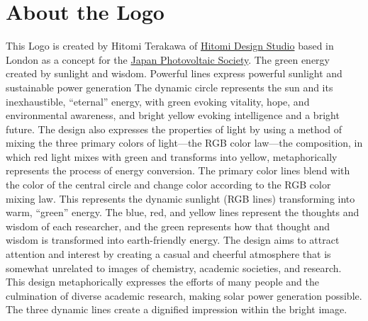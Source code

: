 \documentclass{pst-icon}
\begin{document}
\section{About the Logo}
This Logo is created by Hitomi Terakawa of \href{hitomidesigns.com}{Hitomi Design Studio} based in London as a concept for the \href{https://www.j-pvs.jp/en/}{Japan Photovoltaic Society}. The green energy created by sunlight and wisdom. Powerful lines express powerful sunlight and sustainable power generation 
The dynamic circle represents the sun and its inexhaustible, ``eternal'' energy, with green evoking vitality, hope, and environmental awareness, and bright yellow evoking intelligence and a bright future.
The design also expresses the properties of light by using a method of mixing the three primary colors of light---the RGB color law---the composition, in which red light mixes with green and transforms into yellow, metaphorically represents the process of energy conversion. The primary color lines blend with the color of the central circle and change color according to the RGB color mixing law. This represents the dynamic sunlight (RGB lines) transforming into warm, ``green'' energy. The blue, red, and yellow lines represent the thoughts and wisdom of each researcher, and the green represents how that thought and wisdom is transformed into earth-friendly energy.
The design aims to attract attention and interest by creating a casual and cheerful atmosphere that is somewhat unrelated to images of chemistry, academic societies, and research.
This design metaphorically expresses the efforts of many people and the culmination of diverse academic research, making solar power generation possible. The three dynamic lines create a dignified impression within the bright image.
\end{document}
